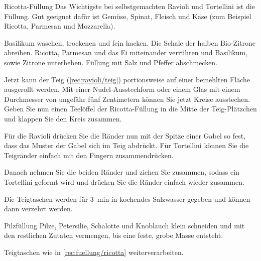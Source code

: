 \documentclass[a4paper, ngerman]{article}
\begin{document}
\begin{recipe}{Ricotta-Füllung}{}{}
    \freeform Das Wichtigste bei selbstgemachten Ravioli und Tortellini ist die Füllung. Gut geeignet dafür ist Gemüse, Spinat, Fleisch und Käse (zum Beispiel Ricotta, Parmesan und Mozzarella).

    Basilikum waschen, trockenen und fein hacken. Die Schale der halben Bio-Zitrone abreiben. Ricotta, Parmesan und das Ei miteinander verrühren und Basilikum, sowie Zitrone unterheben. Füllung mit Salz und Pfeffer abschmecken.

    \newstep
    Jetzt kann der Teig (\cref{rec:ravioli/teig}) portionsweise auf einer bemehlten Fläche ausgerollt werden. Mit einer Nudel-Ausstechform oder einem Glas mit einem Durchmesser von ungefähr fünf Zentimetern können Sie jetzt Kreise ausstechen. Geben Sie nun einen Teelöffel der Ricotta-Füllung in die Mitte der Teig-Plätzchen und klappen Sie den Kreis zusammen.

    Für die Ravioli drücken Sie die Ränder nun mit der Spitze einer Gabel so fest, dass das Muster der Gabel sich im Teig abdrückt. Für Tortellini können Sie die Teigränder einfach mit den Fingern zusammendrücken.

    Danach nehmen Sie die beiden Ränder und ziehen Sie zusammen, sodass ein Tortellini geformt wird und drücken Sie die Ränder einfach wieder zusammen.

    \newstep
    Die Teigtaschen werden für \SI{3}{\minute} in kochendes Salzwasser gegeben und können dann verzehrt werden.
    \freeform\hrulefill
\end{recipe}

\clearpage
\begin{recipe}{Pilzfüllung}{}{}
    Pilze, Petersilie, Schalotte und Knoblauch klein schneiden und mit den restlichen Zutaten vermengen, bis eine feste, grobe Masse entsteht.

    \newstep
    Teigtaschen wie in \cref{rec:fuellung/ricotta} weiterverarbeiten.
    \freeform\hrulefill
\end{recipe}
\end{document}
